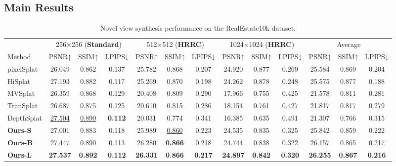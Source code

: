 \subsection{Main Results}
\vspace{-5pt}

\begin{table}[ht]
\centering
\caption{Novel view synthesis performance on the RealEstate10k dataset.}
\label{re10k}
\fontsize{7}{11.5}\selectfont
\setlength{\tabcolsep}{4pt}
\begin{tabular}{lccc|ccc|ccc|ccc}
\toprule
& \multicolumn{3}{c|}{256$\times$256 (\textbf{Standard})} & \multicolumn{3}{c|}{512$\times$512 (\textbf{HRRC})} & \multicolumn{3}{c|}{1024$\times$1024 (\textbf{HRRC})} & \multicolumn{3}{c}{Average} \\
Method & PSNR↑ & SSIM↑ & LPIPS↓ & PSNR↑ & SSIM↑ & LPIPS↓ & PSNR↑ & SSIM↑ & LPIPS↓ & PSNR↑ & SSIM↑ & LPIPS↓ \\
\midrule
pixelSplat  & 26.049 & 0.862 & 0.137 & 25.782 & 0.868 & 0.207 & 24.920 & 0.877 & 0.269 & 25.584 & 0.869 & 0.204 \\
HiSplat  & 27.193 & 0.882 & 0.117 & 25.269 & 0.870 & 0.198 & 24.262 & 0.878 & 0.248 & 25.575 & 0.877 & 0.188 \\

\midrule
MVSplat & 26.359 & 0.868 & 0.129 & 20.408 & 0.809 & 0.290 & 17.966 & 0.755 & 0.425 & 21.578 & 0.811 & 0.281 \\
TranSplat & 26.687 & 0.875 & 0.125 & 20.610 & 0.815 & 0.286 & 18.154 & 0.761 & 0.427 & 21.817 & 0.817 & 0.279 \\
DepthSplat & \underline{27.504} & \underline{0.890} & \textbf{0.112} & 20.031 & 0.774 & 0.341 & 16.385 & 0.635 & 0.491 & 21.307 & 0.766 & 0.315 \\
\textbf{Ours-S} & 27.001 & 0.883 & 0.118 & 25.989 & \underline{0.860} & 0.223 & 24.535 & 0.835 & 0.325 & 25.842 & 0.859 & 0.222 \\
\textbf{Ours-B} & 27.447 & \underline{0.890} & \underline{0.113} & \underline{26.280} & \textbf{0.866} & \underline{0.218} & \underline{24.744} & \underline{0.838} & \underline{0.322} & \underline{26.157} & \underline{0.865} & \underline{0.217} \\
\textbf{Ours-L} & \textbf{27.537} & \textbf{0.892} & \textbf{0.112} & \textbf{26.331} & \textbf{0.866} & \textbf{0.217} & \textbf{24.897} & \textbf{0.842} & \textbf{0.320} & \textbf{26.255} & \textbf{0.867} & \textbf{0.216} \\
\bottomrule
\end{tabular}
\vspace{-15pt}
\end{table}


